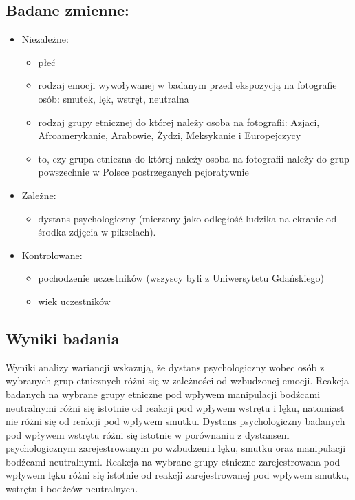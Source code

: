 \documentclass{psychol}
\begin{document}
\subsection{Badane zmienne:}

\begin{itemize}
    \item Niezależne:
    \begin{itemize}
        \item płeć
        \item rodzaj emocji wywoływanej w badanym przed ekspozycją na fotografie osób: smutek, lęk, wstręt, neutralna
        \item rodzaj grupy etnicznej do której należy osoba na fotografii: Azjaci, Afroamerykanie, Arabowie,
        Żydzi, Meksykanie i Europejczycy
        \item to, czy grupa etniczna do której należy osoba na fotografii należy do grup powszechnie w Polsce postrzeganych pejoratywnie
    \end{itemize}
    \item {Zależne:}
    \begin{itemize}
        \item dystans psychologiczny (mierzony jako odległość ludzika na ekranie od środka zdjęcia w pikselach).
    \end{itemize}
    \item {Kontrolowane:}
    \begin{itemize}
        \item pochodzenie uczestników (wszyscy byli z Uniwersytetu Gdańskiego)
        \item wiek uczestników
    \end{itemize}
\end{itemize}

\subsection{Wyniki badania}

Wyniki analizy wariancji wskazują, że dystans psychologiczny wobec osób z wybranych grup etnicznych różni
się w zależności od wzbudzonej emocji. Reakcja badanych na wybrane grupy etniczne pod wpływem manipulacji bodźcami neutralnymi różni się istotnie od reakcji pod wpływem wstrętu i lęku, natomiast nie różni się od reakcji pod wpływem smutku. Dystans psychologiczny badanych pod wpływem wstrętu różni
się istotnie w porównaniu z dystansem psychologicznym zarejestrowanym po wzbudzeniu lęku, smutku oraz manipulacji bodźcami neutralnymi. Reakcja na wybrane grupy etniczne zarejestrowana pod wpływem lęku różni się istotnie od reakcji
zarejestrowanej pod wpływem smutku, wstrętu i bodźców neutralnych.
\end{document}
